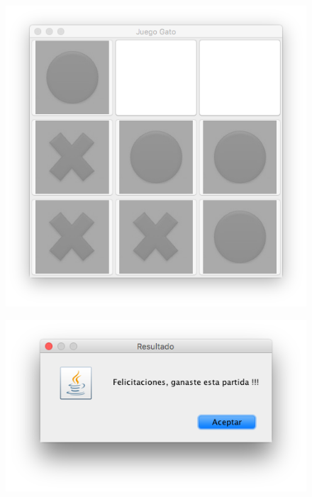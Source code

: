 \documentclass[10pt]{article}
\begin{document}
{\begin{enumerate}
\begin{itemize}
    \begin{figure}[H]
        \begin{center}
            \includegraphics[scale=.5]{img_gano.png}
        \end{center}
    \end{figure}

    \begin{figure}[H]
        \begin{center}
            \includegraphics[scale=.5]{img_msg_gano.png}
        \end{center}
    \end{figure} 
    

\end{itemize}
\end{enumerate}}
\end{document}

